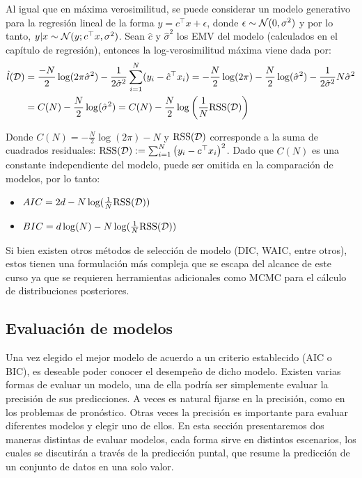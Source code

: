 \begin{mdframed}[style=pendiente, frametitle={\center AIC y BIC para la regresión lineal}]

Al igual que en máxima verosimilitud, se puede considerar un modelo generativo para la regresión lineal de la forma $ y = c^\top x + \epsilon$, donde $\epsilon\sim{\mathcal N}(0,\sigma^2)$ y por lo tanto, $y|x \sim {\mathcal N}(y;c^\top x,\sigma^2)$. Sean $\hat{c}$ y $\hat{\sigma}^2$ los EMV del modelo (calculados en el capítulo de regresión), entonces la log-verosimilitud máxima viene dada por:
\begin{align}
	\hat{l}({\mathcal D}) &= \frac{-N}{2}\log(2\pi\hat{\sigma}^2) - \frac{1}{2\hat{\sigma}^2} \sum_{i=1}^N( y_i-\hat{c}^\top x_i)= -\frac{N}{2}\log(2\pi) - \frac{N}{2}\log(\hat{\sigma}^2) - \frac{1}{2\hat{\sigma}^2}  N\hat{\sigma}^2\\
	&= C(N) - \frac{N}{2}\log(\hat{\sigma}^2) = C(N)- \frac{N}{2}\log\left(\frac{1}{N}\text{RSS}({\mathcal D})\right)
\end{align}	

Donde $C(N) = -\frac{N}{2}\log(2\pi) - N$ y $\text{RSS}({\mathcal D})$ corresponde a la suma de cuadrados residuales: $\text{RSS}({\mathcal D}) := \sum_{i=1}^N \left(y_i - c^\top x_i\right)^2$. Dado que $C(N)$ es una constante independiente del modelo, puede ser omitida en la comparación de modelos, por lo tanto:

\begin{itemize}
	\item $AIC=2d-N\log(\frac{1}{N}\text{RSS}({\mathcal D}))$
	\item $BIC = d\log(N) - N\log(\frac{1}{N}\text{RSS}({\mathcal D}))$
\end{itemize}

\end{mdframed}

Si bien existen otros métodos de selección de modelo (DIC, WAIC, entre otros), estos tienen una formulación más compleja que se escapa del alcance de este curso ya que se requieren herramientas adicionales como MCMC para el cálculo de distribuciones posteriores.

\subsection{Evaluación de modelos}
Una vez elegido el mejor modelo de acuerdo a un criterio establecido (AIC o BIC), es deseable poder conocer el desempeño de dicho modelo. Existen varias formas de evaluar un modelo, una de ella podría ser simplemente evaluar la precisión de sus predicciones. A veces es natural fijarse en la precisión, como en los problemas de pronóstico. Otras veces la precisión es importante para evaluar diferentes modelos y elegir uno de ellos. En esta sección presentaremos dos maneras distintas de evaluar modelos, cada forma sirve en distintos escenarios, los cuales se discutirán a través de la predicción puntal, que resume la predicción de un conjunto de datos en una solo valor.

